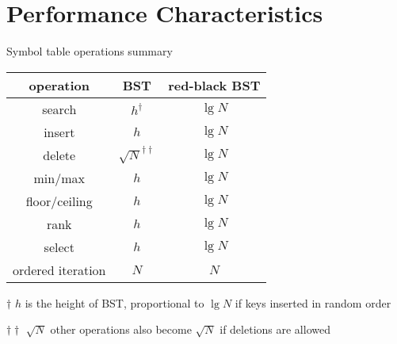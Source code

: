 \documentclass[8pt,a4paper,compress]{beamer}
\begin{document}
\section{Performance Characteristics}
\begin{frame}[fragile]
\pause

Symbol table operations summary

\begin{center}
\begin{tabular}{ccc}
operation & BST & red-black BST \\ \hline
search & $h^\dagger$ & $\lg N$ \\
insert & $h$ & $\lg N$ \\
delete & $\sqrt{N}^{\dagger\dagger}$ & $\lg N$ \\
min/max & $h$ & $\lg N$ \\
floor/ceiling & $h$ & $\lg N$ \\
rank & $h$ & $\lg N$ \\
select & $h$ & $\lg N$ \\
ordered iteration & $N$ & $N$ 
\end{tabular}

\bigskip

\tiny $\dagger$ $h$ is the height of BST, proportional to $\lg N$ if keys inserted in random order

$\dagger\dagger$ $\sqrt{N}$ other operations also become $\sqrt{N}$ if deletions are allowed
\end{center} 
\end{frame}
\end{document}
